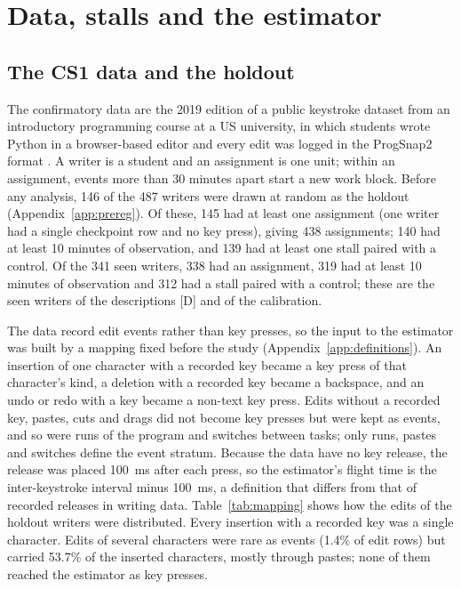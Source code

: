 \section{Data, stalls and the estimator}
\label{sec:data}

\subsection{The CS1 data and the holdout}

The confirmatory data are the 2019 edition of a public keystroke dataset from an introductory programming course at a
US university, in which students wrote Python in a browser-based editor and every edit was logged in the ProgSnap2
format \cite{edwards2023cs1}. A writer is a student and an assignment is one unit; within an assignment, events more than
30 minutes apart start a new work block. Before any analysis, 146 of the 487 writers were drawn at random as the holdout
(Appendix~\ref{app:prereg}). Of these, 145 had at least one assignment (one writer had a single checkpoint row and no key
press), giving 438 assignments; 140 had at least 10 minutes of observation, and 139 had at least one stall paired with
a control. Of the 341 seen writers, 338 had an assignment, 319 had at least 10 minutes of observation and 312 had a stall
paired with a control; these are the seen writers of the descriptions [D] and of the calibration.

The data record edit events rather than key presses, so the input to the estimator was built by a mapping fixed before
the study (Appendix~\ref{app:definitions}). An insertion of one character with a recorded key became a key press of that
character's kind, a deletion with a recorded key became a backspace, and an undo or redo with a key became a non-text
key press. Edits without a recorded key, pastes, cuts and drags did not become key presses but were kept as events, and so were
runs of the program and switches between tasks; only runs, pastes and switches define the event stratum. Because the data have no key release, the release was placed 100~ms
after each press, so the estimator's flight time is the inter-keystroke interval minus 100~ms, a definition that differs
from that of recorded releases in writing data. Table~\ref{tab:mapping} shows how the edits of the holdout writers were
distributed. Every insertion with a recorded key was a single character. Edits of several characters were rare as
events (1.4\% of edit rows) but carried 53.7\% of the inserted characters, mostly through pastes; none of them reached
the estimator as key presses.

